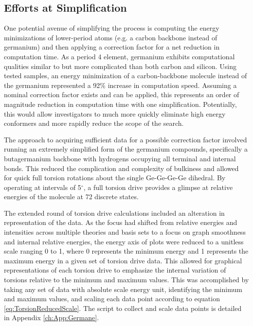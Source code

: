 \subsection{Efforts at Simplification}

One potential avenue of simplifying the process is computing the energy minimizations of lower-period atoms (e.g. a carbon backbone instead of germanium) and then applying a correction factor for a net reduction in computation time.
As a period 4 element, germanium exhibits computational qualities similar to but more complicated than both carbon and silicon.
Using tested samples, an energy minimization of a carbon-backbone molecule instead of the germanium represented a 92\% increase in computation speed.
Assuming a nominal correction factor exists and can be applied, this represents an order of magnitude reduction in computation time with one simplification. 
Potentially, this would allow investigators to much more quickly eliminate high energy conformers and more rapidly reduce the scope of the search.

The approach to acquiring sufficient data for a possible correction factor involved running an extremely simplified form of the germanium compounds, specifically a butagermanium backbone with hydrogens occupying all terminal and internal bonds.
This reduced the complication and complexity of bulkiness and allowed for quick full torsion rotations about the single Ge-Ge-Ge-Ge dihedral.
By operating at intervals of 5$^{\circ}$, a full torsion drive provides a glimpse at relative energies of the molecule at 72 discrete states. 

The extended round of torsion drive calculations included an alteration in representation of the data.
As the focus had shifted from relative energies and intensities across multiple theories and basis sets to a focus on graph smoothness and internal relative energies, the energy axis of plots were reduced to a unitless scale ranging 0 to 1, where 0 represents the minimum energy and 1 represents the maximum energy in a given set of torsion drive data.
This allowed for graphical representations of each torsion drive to emphasize the internal variation of torsions relative to the minimum and maximum values.
This was accomplished by taking any set of data with absolute scale energy unit, identifying the minimum and maximum values, and scaling each data point according to equation \ref{eq:TorsionReducedScale}. 
The script to collect and scale data points is detailed in Appendix \ref{ch:App:Germane}.

